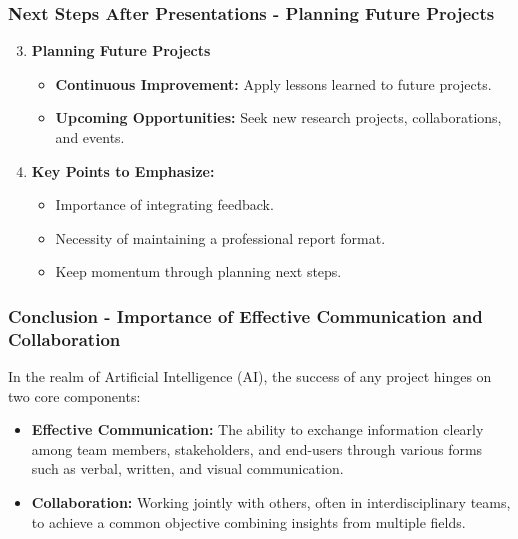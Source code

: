 \documentclass{beamer}
\begin{document}
\begin{frame}[fragile]
    \frametitle{Next Steps After Presentations - Planning Future Projects}
    \begin{enumerate}
        \setcounter{enumi}{2} %
        \item \textbf{Planning Future Projects}
        \begin{itemize}
            \item \textbf{Continuous Improvement:} Apply lessons learned to future projects.
            \item \textbf{Upcoming Opportunities:} Seek new research projects, collaborations, and events.
        \end{itemize}
        \item \textbf{Key Points to Emphasize:}
        \begin{itemize}
            \item Importance of integrating feedback.
            \item Necessity of maintaining a professional report format.
            \item Keep momentum through planning next steps.
        \end{itemize}
    \end{enumerate}
\end{frame}

\begin{frame}[fragile]
    \frametitle{Conclusion - Importance of Effective Communication and Collaboration}

    In the realm of Artificial Intelligence (AI), the success of any project hinges on two core components:
    \begin{itemize}
        \item \textbf{Effective Communication:} The ability to exchange information clearly among team members, stakeholders, and end-users through various forms such as verbal, written, and visual communication.
        \item \textbf{Collaboration:} Working jointly with others, often in interdisciplinary teams, to achieve a common objective combining insights from multiple fields.
    \end{itemize}
\end{frame}
\end{document}
